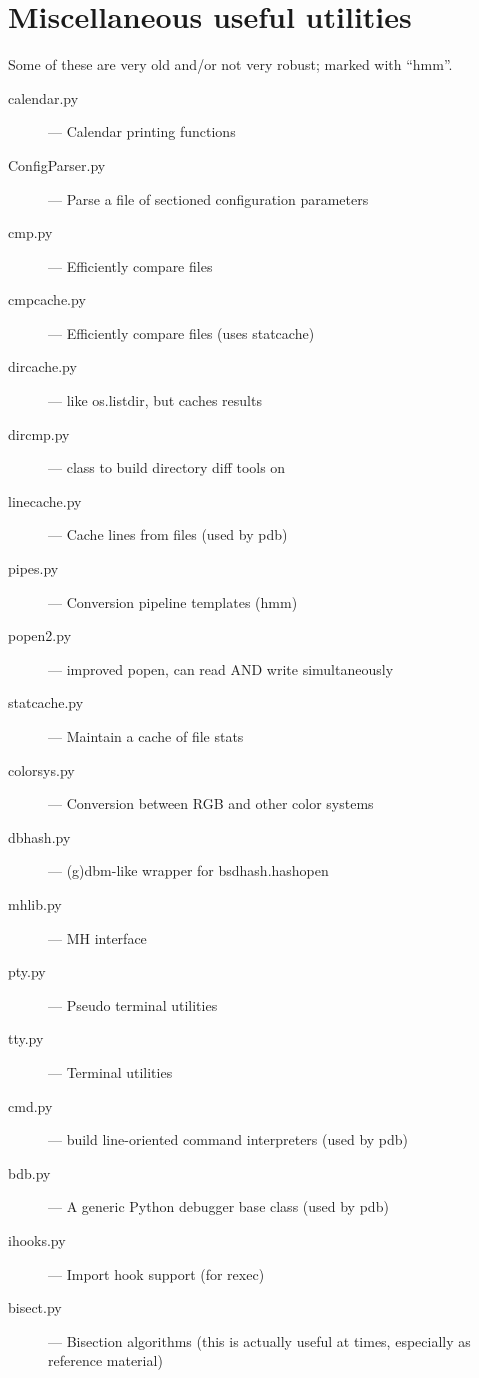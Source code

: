 \section{Miscellaneous useful utilities}

Some of these are very old and/or not very robust; marked with ``hmm''.

\begin{description}
\item[calendar.py]
--- Calendar printing functions

\item[ConfigParser.py]
--- Parse a file of sectioned configuration parameters

\item[cmp.py]
--- Efficiently compare files

\item[cmpcache.py]
--- Efficiently compare files (uses statcache)

\item[dircache.py]
--- like os.listdir, but caches results

\item[dircmp.py]
--- class to build directory diff tools on

\item[linecache.py]
--- Cache lines from files (used by pdb)

\item[pipes.py]
--- Conversion pipeline templates (hmm)

\item[popen2.py]
--- improved popen, can read AND write simultaneously

\item[statcache.py]
--- Maintain a cache of file stats

\item[colorsys.py]
--- Conversion between RGB and other color systems

\item[dbhash.py]
--- (g)dbm-like wrapper for bsdhash.hashopen

\item[mhlib.py]
--- MH interface

\item[pty.py]
--- Pseudo terminal utilities

\item[tty.py]
--- Terminal utilities

\item[cmd.py]
--- build line-oriented command interpreters (used by pdb)

\item[bdb.py]
--- A generic Python debugger base class (used by pdb)

\item[ihooks.py]
--- Import hook support (for rexec)

\item[bisect.py]
--- Bisection algorithms (this is actually useful at times,
especially as reference material)
\end{description}


